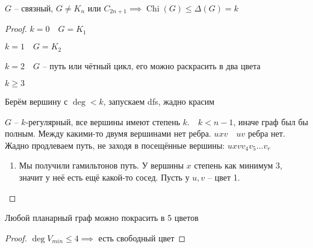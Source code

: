 \documentclass{book}
\theoremstyle{definition}
\DeclareMathOperator{\Chi}{Chi}
\begin{document}
\begin{theorem}
    [Брукс]

    $G$ -- связный,  $G\neq K_n$ или $C_{2n+1} \implies \Chi(G) \leqslant \Delta(G) = k$
\end{theorem}
\begin{proof}
    $k = 0\quad G = K_1$

    $k = 1\quad G = K_2$

    $k=2\quad G$ -- путь или чётный цикл, его можно раскрасить в два цвета

     $k\geqslant 3$

     Берём вершину с $\deg < k$, запускаем dfs, жадно красим

     $G$ --  $k$-регулярный, все вершины имеют степень  $k.\quad k < n-1$, иначе граф был бы полным. Между какими-то двумя вершинами нет ребра.  $uxv\quad uv$ ребра нет. Жадно продлеваем путь, не заходя в посещённые вершины:  $uxv v_4 v_5 \ldots v_r$
     \begin{enumerate}
         \item Мы получили гамильтонов путь. У вершины $x$ степень как минимум 3, значит у неё есть ещё какой-то сосед. Пусть у  $u,v$ -- цвет 1.
     \end{enumerate}
\end{proof}

\begin{statement}
    Любой планарный граф можно покрасить в 5 цветов
\end{statement}
\begin{proof}
    $\deg V_{min}\leqslant 4 \implies $ есть свободный цвет
\end{proof}

\begin{theorem}
    
\end{theorem}
\end{document}
